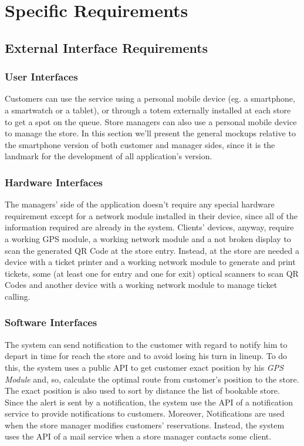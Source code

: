 \documentclass{article}
\begin{document}
\section{Specific Requirements}

	\subsection{External Interface Requirements}
	
		\subsubsection{User Interfaces}
		
			Customers can use the service using a personal mobile device (eg. a smartphone, a smartwatch or a tablet), or through a totem externally installed at each store to get a spot on the queue. Store managers can also use a personal mobile device to manage the store. In this section we’ll present the general mockups relative to the smartphone version of both customer and manager sides, since it is the landmark for the development of all application's version.
		\subsubsection{Hardware Interfaces}
		
			The managers’ side of the application doesn’t require any special hardware requirement except for a network module installed in their device, since all of the information required are already in the system. Clients’ devices, anyway, require a working GPS module, a working network module and a not broken display to scan the generated QR Code at the store entry. Instead, at the store are needed a device with a ticket printer and a working network module to generate and print tickets, some (at least one for entry and one for exit) optical scanners to scan QR Codes and another device with a working network module to manage ticket calling.
			
			
		\subsubsection{Software Interfaces}
		
			The system can send notification to the customer with regard to notify him to depart in time for reach the store and to avoid losing his turn in lineup. To do this, the system uses a public API to get customer exact position by his \emph{GPS Module} and, so, calculate the optimal route from customer's position to the store. The exact position is also used to sort by distance the list of bookable store. Since the alert is sent by a notification, the system use the API of a notification service to provide notifications to customers. Moreover, Notifications are used when the store manager modifies customers' reservations. Instead, the system uses the API of a mail service when a store manager contacts some client.
			
\end{document}
